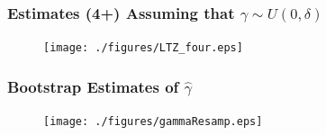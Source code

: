 \documentclass[9pt,letterpaper,subeqn]{beamer}
\begin{document}
\begin{frame}[label=Conley4]
\frametitle{Estimates (4+) Assuming that $\gamma \sim U(0,\delta)$}
\begin{figure}[htpb!]
\centering
  \texttt{[image: ./figures/LTZ\_four.eps]}
\end{figure}
\hyperlink{Conley3}{}
\end{frame}

\begin{frame}[label=gammaResamp]
  \frametitle{Bootstrap Estimates of $\hat\gamma$}
  \begin{figure}[htpb!]
    \centering
    \texttt{[image: ./figures/gammaResamp.eps]}
  \end{figure}
  \hyperlink{gammaEst}{}
  \end{frame}
\end{document}
